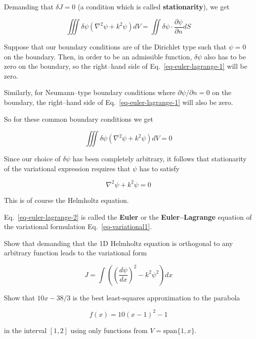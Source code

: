 Demanding that $\delta J = 0$ (a condition which is called \textbf{stationarity}), we get

\begin{equation}
\iiint \delta \psi (\nabla^2 \psi + k^2 \psi ) dV = \iint \delta \psi \cdot \frac{\partial \psi}{\partial n} dS \label{eq-euler-lagrange-1}
\end{equation}

Suppose that our boundary conditions are of the Dirichlet type such that $\psi=0$ on the boundary. Then, in order to be an admissible function, $\delta \psi$ also has to be zero on the boundary, so the right--hand side of Eq.~\ref{eq-euler-lagrange-1} will be zero.

Similarly, for Neumann--type boundary conditions where $\partial \psi / \partial n = 0$ on the boundary, the right--hand side of Eq.~\ref{eq-euler-lagrange-1} will also be zero.

So for these common boundary conditions we get

\begin{equation}
\iiint \delta \psi (\nabla^2 \psi + k^2 \psi ) dV = 0
\end{equation} 

Since our choice of $\delta \psi$ has been completely arbitrary, it follows that stationarity of the variational expression requires that $\psi$ has to satisfy

\begin{equation}
\nabla^2 \psi + k^2 \psi = 0 \label{eq-euler-lagrange-2}
\end{equation} 

This is of course the Helmholtz equation.

Eq.~\ref{eq-euler-lagrange-2} is called the \textbf{Euler} or the \textbf{Euler--Lagrange} equation of the variational formulation Eq.~\ref{eq-variational1}.


\pagebreak

\begin{exer}
Show that demanding that the 1D Helmholtz equation is orthogonal to any arbitrary function leads to the variational form 

$$J = \int \left( \left(\frac{d \psi}{d x}\right)^2 - k^2 \psi^2 \right) dx$$

\end{exer}



\begin{exer}
Show that $10x-38/3$ is the best least-squares approximation to the parabola 

$$f(x) = 10(x-1)^2 -1$$ 

in the interval $[1,2]$ using only functions from $V = \mathrm{span} \{1, x\}$.

\end{exer}



